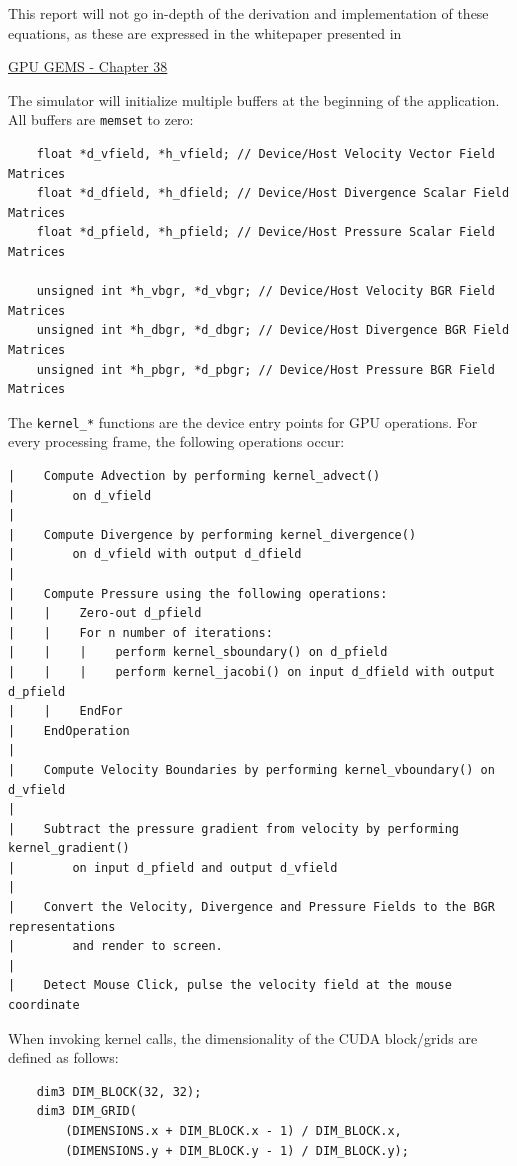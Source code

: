 \documentclass[
10pt, %
letterpaper, %
oneside, %
headinclude,footinclude, %
BCOR5mm, %
]{scrartcl}
\begin{document}
This report will not go in-depth of the derivation and implementation of these equations, as these are expressed in the whitepaper presented in
\begin{center}
    \href{https://developer.nvidia.com/gpugems/gpugems/part-vi-beyond-triangles/chapter-38-fast-fluid-dynamics-simulation-gpu}{GPU GEMS - Chapter 38}
\end{center}

The simulator will initialize multiple buffers at the beginning of the application. All buffers are \verb|memset| to zero:
\begin{verbatim}
    float *d_vfield, *h_vfield; // Device/Host Velocity Vector Field Matrices
    float *d_dfield, *h_dfield; // Device/Host Divergence Scalar Field Matrices
    float *d_pfield, *h_pfield; // Device/Host Pressure Scalar Field Matrices
    
    unsigned int *h_vbgr, *d_vbgr; // Device/Host Velocity BGR Field Matrices
    unsigned int *h_dbgr, *d_dbgr; // Device/Host Divergence BGR Field Matrices
    unsigned int *h_pbgr, *d_pbgr; // Device/Host Pressure BGR Field Matrices
\end{verbatim}

The \verb|kernel_*| functions are the device entry points for GPU operations. For every processing frame, the following operations occur:

\begin{verbatim}
|    Compute Advection by performing kernel_advect()
|        on d_vfield
|
|    Compute Divergence by performing kernel_divergence()
|        on d_vfield with output d_dfield
|
|    Compute Pressure using the following operations:
|    |    Zero-out d_pfield
|    |    For n number of iterations:
|    |    |    perform kernel_sboundary() on d_pfield
|    |    |    perform kernel_jacobi() on input d_dfield with output d_pfield
|    |    EndFor
|    EndOperation
|
|    Compute Velocity Boundaries by performing kernel_vboundary() on d_vfield
|    
|    Subtract the pressure gradient from velocity by performing kernel_gradient()
|        on input d_pfield and output d_vfield
|
|    Convert the Velocity, Divergence and Pressure Fields to the BGR representations
|        and render to screen.
|
|    Detect Mouse Click, pulse the velocity field at the mouse coordinate
\end{verbatim}

When invoking kernel calls, the dimensionality of the CUDA block/grids are defined as follows:
\begin{verbatim}
    dim3 DIM_BLOCK(32, 32);
    dim3 DIM_GRID(
        (DIMENSIONS.x + DIM_BLOCK.x - 1) / DIM_BLOCK.x,
        (DIMENSIONS.y + DIM_BLOCK.y - 1) / DIM_BLOCK.y);
\end{verbatim}
\end{document}
